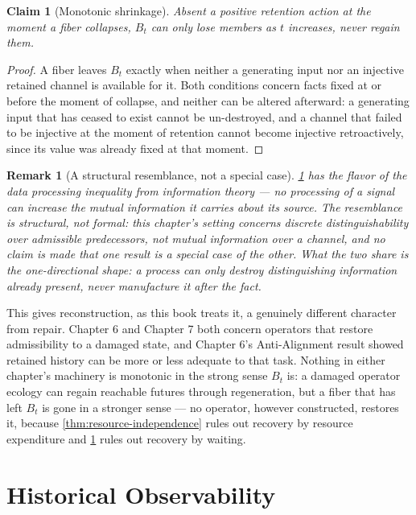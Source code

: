 \documentclass[12pt]{report}
\newtheorem{claim}[definition]{Claim}
\newtheorem{remark}[definition]{Remark}
\begin{document}
\begin{claim}[Monotonic shrinkage]
\label{prop:monotonic-shrinkage}
Absent a positive retention action at the moment a fiber collapses,
$B_t$ can only lose members as $t$ increases, never regain them.
\end{claim}

\begin{proof}
A fiber leaves $B_t$ exactly when neither a generating input nor an
injective retained channel is available for it. Both conditions concern
facts fixed at or before the moment of collapse, and neither can be
altered afterward: a generating input that has ceased to exist cannot be
un-destroyed, and a channel that failed to be injective at the moment of
retention cannot become injective retroactively, since its value was
already fixed at that moment.
\end{proof}

\begin{remark}[A structural resemblance, not a special case]
\label{rem:dpi-resemblance}
\cref{prop:monotonic-shrinkage} has the flavor of the data processing
inequality from information theory --- no processing of a signal can
increase the mutual information it carries about its source. The
resemblance is structural, not formal: this chapter's setting concerns
discrete distinguishability over admissible predecessors, not mutual
information over a channel, and no claim is made that one result is a
special case of the other. What the two share is the one-directional
shape: a process can only destroy distinguishing information already
present, never manufacture it after the fact.
\end{remark}

This gives reconstruction, as this book treats it, a genuinely different
character from repair. Chapter 6 and Chapter 7 both concern operators
that restore admissibility to a damaged state, and Chapter 6's
Anti-Alignment result showed retained history can be more or less
adequate to that task. Nothing in either chapter's machinery is
monotonic in the strong sense $B_t$ is: a damaged operator ecology can
regain reachable futures through regeneration, but a fiber that has left
$B_t$ is gone in a stronger sense --- no operator, however constructed,
restores it, because \cref{thm:resource-independence} rules out recovery
by resource expenditure and \cref{prop:monotonic-shrinkage} rules out
recovery by waiting.

\section{Historical Observability}
\label{sec:historical-observability}
\end{document}
